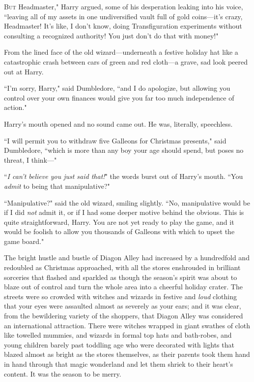 
\lettrine[ante=``]{B}{ut} Headmaster," Harry argued, some of his desperation leaking into his voice, ``leaving all of my assets in one undiversified vault full of gold coins---it's crazy, Headmaster! It's like, I don't know, doing Transfiguration experiments without consulting a recognized authority! You just don't do that with money!"

From the lined face of the old wizard---underneath a festive holiday hat like a catastrophic crash between cars of green and red cloth---a grave, sad look peered out at Harry.

``I'm sorry, Harry," said Dumbledore, ``and I do apologize, but allowing you control over your own finances would give you far too much independence of action."

Harry's mouth opened and no sound came out. He was, literally, speechless.

``I will permit you to withdraw five Galleons for Christmas presents," said Dumbledore, ``which is more than any boy your age should spend, but poses no threat, I think---"

``\emph{I can't believe you just said that!}" the words burst out of Harry's mouth. ``You \emph{admit} to being that manipulative?"

``Manipulative?" said the old wizard, smiling slightly. ``No, manipulative would be if I did \emph{not} admit it, or if I had some deeper motive behind the obvious. This is quite straightforward, Harry. You are not yet ready to play the game, and it would be foolish to allow you thousands of Galleons with which to upset the game board."

\later

The bright hustle and bustle of Diagon Alley had increased by a hundredfold and redoubled as Christmas approached, with all the stores enshrouded in brilliant sorceries that flashed and sparkled as though the season's spirit was about to blaze out of control and turn the whole area into a cheerful holiday crater. The streets were so crowded with witches and wizards in festive and \emph{loud} clothing that your eyes were assaulted almost as severely as your ears; and it was clear, from the bewildering variety of the shoppers, that Diagon Alley was considered an international attraction. There were witches wrapped in giant swathes of cloth like towelled mummies, and wizards in formal top hats and bath-robes, and young children barely past toddling age who were decorated with lights that blazed almost as bright as the stores themselves, as their parents took them hand in hand through that magic wonderland and let them shriek to their heart's content. It was the season to be merry.


